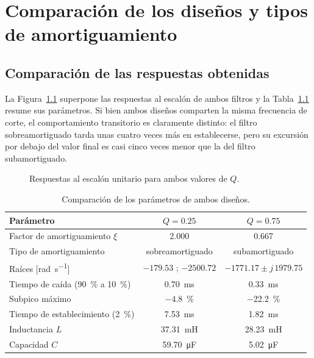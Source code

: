 \chapter{Comparación de los diseños y tipos de amortiguamiento}
\label{chap:comparacion}

\section{Comparación de las respuestas obtenidas}

La Figura~\ref{fig:escalon-comparacion} superpone las respuestas al escalón de ambos filtros y la
Tabla~\ref{tab:comparacion} resume sus parámetros. Si bien ambos diseños comparten la misma frecuencia de
corte, el comportamiento transitorio es claramente distinto: el filtro sobreamortiguado tarda unas cuatro
veces más en establecerse, pero su excursión por debajo del valor final es casi cinco veces menor que la
del filtro subamortiguado.

\begin{figure}[!ht]
  \centering
  
  \caption{Respuestas al escalón unitario para ambos valores de $Q$.}
  \label{fig:escalon-comparacion}
\end{figure}

\begin{table}[!ht]
  \centering
  \begin{tabular}{|l|c|c|}
    \hline
    Parámetro & $Q = \num{0.25}$ & $Q = \num{0.75}$ \\
    \hline
    Factor de amortiguamiento $\xi$                          & \num{2.000} & \num{0.667} \\
    Tipo de amortiguamiento                                   & sobreamortiguado & subamortiguado \\
    Raíces [\unit{\radian\per\second}]                        & $\num{-179.53}$ ; $\num{-2500.72}$
                                                              & $\num{-1771.17} \pm j\,\num{1979.75}$ \\
    Tiempo de caída (\qty{90}{\percent} a \qty{10}{\percent}) & \qty{0.70}{\milli\second}
                                                              & \qty{0.33}{\milli\second} \\
    Subpico máximo                                            & \qty{-4.8}{\percent} & \qty{-22.2}{\percent} \\
    Tiempo de establecimiento (\qty{2}{\percent})             & \qty{7.53}{\milli\second} & \qty{1.82}{\milli\second} \\
    Inductancia $L$                                           & \qty{37.31}{\milli\henry} & \qty{28.23}{\milli\henry} \\
    Capacidad $C$                                             & \qty{59.70}{\micro\farad} & \qty{5.02}{\micro\farad} \\
    \hline
  \end{tabular}
  \caption{Comparación de los parámetros de ambos diseños.}
  \label{tab:comparacion}
\end{table}


